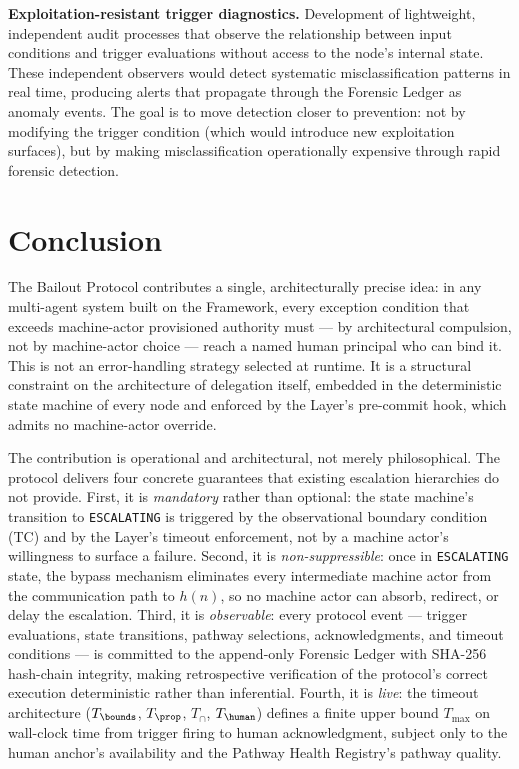 \textbf{Exploitation-resistant trigger diagnostics.}  Development of lightweight, independent audit processes that observe the relationship between input conditions and trigger evaluations without access to the node's internal state.  These independent observers would detect systematic misclassification patterns in real time, producing alerts that propagate through the Forensic Ledger as anomaly events.  The goal is to move detection closer to prevention: not by modifying the trigger condition (which would introduce new exploitation surfaces), but by making misclassification operationally expensive through rapid forensic detection.

\section{Conclusion}
\label{sec:conclusion}

The Bailout Protocol contributes a single, architecturally precise idea: in any multi-agent system built on the \bxthree{} Framework, every exception condition that exceeds machine-actor provisioned authority must --- by architectural compulsion, not by machine-actor choice --- reach a named human principal who can bind it.  This is not an error-handling strategy selected at runtime.  It is a structural constraint on the architecture of delegation itself, embedded in the deterministic state machine of every \bxthree{} node and enforced by the \fact{} Layer's pre-commit hook, which admits no machine-actor override.

The contribution is operational and architectural, not merely philosophical.  The protocol delivers four concrete guarantees that existing escalation hierarchies do not provide.  First, it is \emph{mandatory} rather than optional: the state machine's transition to \texttt{ESCALATING} is triggered by the observational boundary condition (TC) and by the \fact{} Layer's timeout enforcement, not by a machine actor's willingness to surface a failure.  Second, it is \emph{non-suppressible}: once in \texttt{ESCALATING} state, the bypass mechanism eliminates every intermediate machine actor from the communication path to $h(n)$, so no machine actor can absorb, redirect, or delay the escalation.  Third, it is \emph{observable}: every protocol event --- trigger evaluations, state transitions, pathway selections, acknowledgments, and timeout conditions --- is committed to the append-only Forensic Ledger with SHA-256 hash-chain integrity, making retrospective verification of the protocol's correct execution deterministic rather than inferential.  Fourth, it is \emph{live}: the timeout architecture ($T_{\bounds}$, $T_{\prop}$, $T_{\cap}$, $T_{\human}$) defines a finite upper bound $T_{\max}$ on wall-clock time from trigger firing to human acknowledgment, subject only to the human anchor's availability and the Pathway Health Registry's pathway quality.

